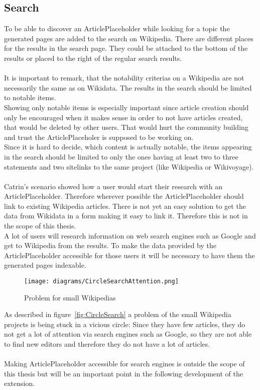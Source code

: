 \subsection{Search}
To be able to discover an ArticlePlaceholder while looking for a topic the generated pages are added to the search on Wikipedia. There are different places for the results in the search page. They could be attached to the bottom of the results or placed to the right of the regular search results. \\
\\
It is important to remark, that the notability criterias on a Wikipedia are not necessarily the same as on Wikidata. The results in the search should be limited to notable items. \\
Showing only notable items is especially important since article creation should only be encouraged when it makes sense in order to not have articles created, that would be deleted by other users. That would hurt the community building and trust the ArticlePlaceholer is supposed to be working on. \\
Since it is hard to decide, which content is actually notable, the items appearing in the search should be limited to only the ones having at least two to three statements and two sitelinks to the same project (like Wikipedia or Wikivoyage). \\
\\
Catrin's scenario showed how a user would start their research with an ArticlePlaceholder. Therefore wherever possible the ArticlePlaceholder should link to existing Wikipedia articles. There is not yet an easy solution to get the data from Wikidata in a form making it easy to link it. Therefore this is not in the scope of this thesis.
\\
A lot of users will research information on web search engines such as Google and get to Wikipedia from the results. To make the data provided by the ArticlePlaceholder accessible for those users it will be necessary to have them the generated pages indexable. 
\begin{figure}[H]\label{fig:CircleSearch}
	\centering
	\texttt{[image: diagrams/CircleSearchAttention.png]}
	\caption{Problem for small Wikipedias}
	\label{diagramCircleSearch}
\end{figure}
As described in figure~\ref{fig:CircleSearch} a problem of the small Wikipedia projects is being stuck in a vicious circle: Since they have few articles, they do not get a lot of attention via search engines such as Google, so they are not able to find new editors and therefore they do not have a lot of articles. \\
\\
Making ArticlePlaceholder accessible for search engines is outside the scope of this thesis but will be an important point in the following development of the extension. 

